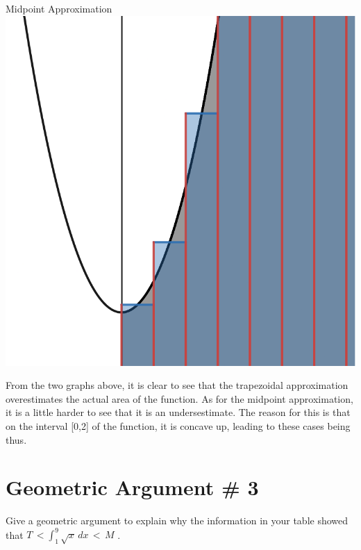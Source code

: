 \documentclass[letterpaper,12pt]{article}
\theoremstyle{definition}
\begin{document}
\begin{minipage}{0.45\textwidth}
 \begin{center}
  Midpoint Approximation
  \vskip 16pt
  \includegraphics[scale=0.25]{midpoint.png}
 \end{center}
\end{minipage}

\vspace{1cm}

From the two graphs above, it is clear to see that the trapezoidal approximation overestimates the actual area of the function. As for the midpoint approximation, it is a little harder to see that it is an undersestimate. The reason for this is that on the interval [0,2] of the function, it is concave up, leading to these cases being thus.

\pagebreak

\section{Geometric Argument \# 3}

\begin{large}
 Give a geometric argument to explain why the information in your table showed that $T\, <  \int_{1}^{9} \sqrt{x} \, dx\, <\, M$ .
\end{large}
\end{document}
